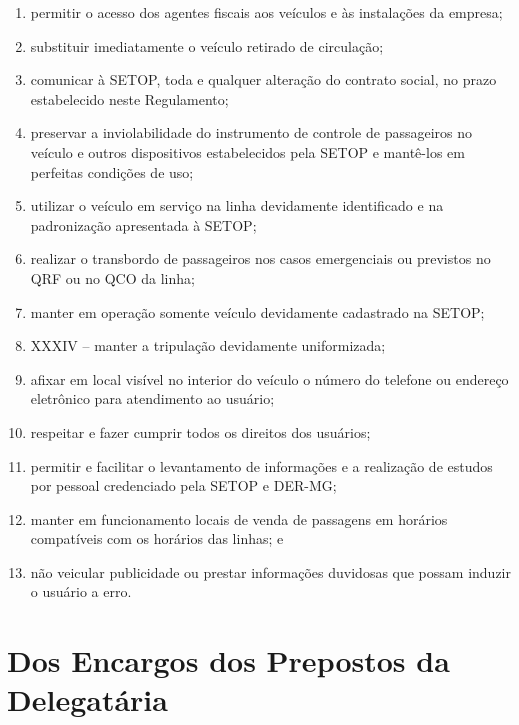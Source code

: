 \begin{enumerate}[resume, label=Art. \arabic*]
\begin{enumerate}[label=\roman*.]
\item permitir o acesso dos agentes fiscais aos veículos e às instalações da empresa;

\item substituir imediatamente o veículo retirado de circulação;

\item comunicar à SETOP, toda e qualquer alteração do contrato social, no prazo estabelecido neste Regulamento;

\item preservar a inviolabilidade do instrumento de controle de passageiros no veículo e outros dispositivos estabelecidos pela SETOP e mantê-los em perfeitas condições de uso;

\item utilizar o veículo em serviço na linha devidamente identificado e na padronização apresentada à SETOP;

\item realizar o transbordo de passageiros nos casos emergenciais ou previstos no QRF ou no QCO da linha;

\item manter em operação somente veículo devidamente cadastrado na SETOP;

\item XXXIV – manter a tripulação devidamente uniformizada;

\item afixar em local visível no interior do veículo o número do telefone ou endereço eletrônico para atendimento ao usuário;

\item respeitar e fazer cumprir todos os direitos dos usuários;

\item permitir e facilitar o levantamento de informações e a realização de estudos por pessoal credenciado pela SETOP e DER-MG;

\item manter em funcionamento locais de venda de passagens em horários compatíveis com os horários das linhas; e

\item não veicular publicidade ou prestar informações duvidosas que possam induzir o usuário a erro.

\end{enumerate}

\end{enumerate}

\section{Dos Encargos dos Prepostos da Delegatária}

